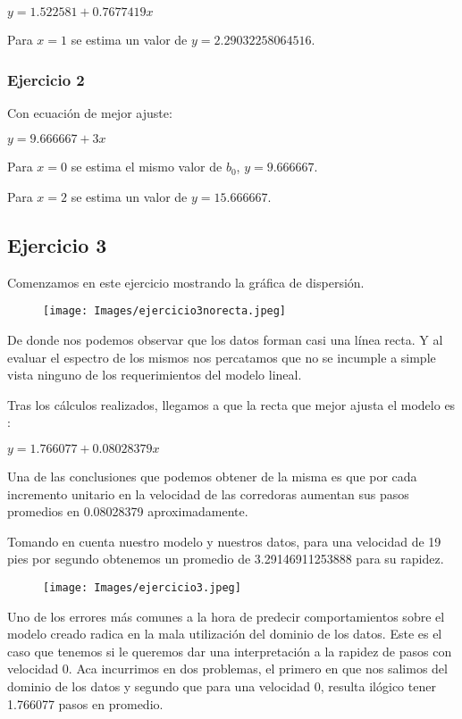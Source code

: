 \documentclass[a4paper,10pt,twocolumn]{article}
\begin{document}
			\begin{center}
				$y = 1.522581 + 0.7677419x$
			\end{center}
			
			Para $x = 1$ se estima un valor de $y = 2.29032258064516$.
			
			\subsubsection{Ejercicio 2}
			
			Con ecuación de mejor ajuste:
			
			\begin{center}
				$y = 9.666667 + 3x$
			\end{center}
			
			
			Para $x = 0$ se estima el mismo valor de $b_0$, $y = 9.666667$.
			
			Para $x = 2$ se estima un valor de $y = 15.666667$.
		
		\subsection{Ejercicio 3}
			Comenzamos en este ejercicio mostrando la gráfica de dispersión.
			
			\begin{figure}[htb]
				\texttt{[image: Images/ejercicio3norecta.jpeg]}
			\end{figure}
		
			De donde nos podemos observar que los datos forman casi una línea recta. Y al evaluar el espectro de los mismos nos percatamos que no se incumple a simple vista ninguno de los requerimientos del modelo lineal. 
			
			Tras los cálculos realizados, llegamos a que la recta que mejor ajusta el modelo es :
			
			\begin{center}
				$y = 1.766077 + 0.08028379x$
			\end{center}
		
			Una de las conclusiones que podemos obtener de la misma es que por cada incremento unitario en la velocidad de las corredoras aumentan sus pasos promedios en 0.08028379 aproximadamente.
			
			Tomando en cuenta nuestro modelo y nuestros datos, para una velocidad de 19 pies por segundo obtenemos un promedio de 3.29146911253888 para su rapidez.
		
			\begin{figure}[htb]
				\texttt{[image: Images/ejercicio3.jpeg]}
			\end{figure}
		
			Uno de los errores más comunes a la hora de predecir comportamientos sobre el modelo creado radica en la mala utilización del dominio de los datos. Este es el caso que tenemos si le queremos dar una interpretación a la rapidez de pasos con velocidad 0. Aca incurrimos en dos problemas, el primero en que nos salimos del dominio de los datos y segundo que para una velocidad 0, resulta ilógico tener 1.766077 pasos en promedio.
		
					


\label{end}
\end{document}
